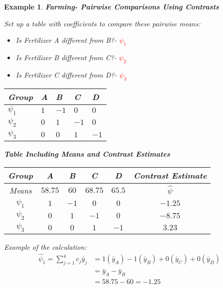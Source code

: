 \documentclass[a4paper,11pt]{article}
\newtheorem{eg}[thm]{Example}
\begin{document}
\begin{eg}
\normalfont
\textbf{Farming- Pairwise Comparisons Using Contrasts}

Set up a table with coefficients to compare these pairwise means:
\begin{itemize}
\item Is Fertilizer A different from B?- \textcolor{red}{$\psi_1$}
\item Is Fertilizer B different from C?- \textcolor{red}{$\psi_2$}
\item Is Fertilizer C different from D?- \textcolor{red}{$\psi_3$}
\end{itemize}

\begin{center}
\begin{tabular}{ |p{1cm}||p{1cm}|p{1cm}|p{1cm}|p{1cm}|  }
 \hline
 Group & A & B & C & D \\
 \hline
 $\psi_1$   & $1$    &$-1$&   $0$ & $0$\\
 $\psi_2$ &   $0$  & $1$   & $-1$ & $0$\\
 $\psi_3$ & $0$ & $0$ & $1$ & $-1$\\
 \hline
\end{tabular}
\end{center}
\newpage
\textbf{Table Including Means and Contrast Estimates}

\begin{center}
\begin{tabular}{ |c||c|c|c|c|c|  }
 \hline
 Group & A & B & C & D & Contrast Estimate\\
 \hline
 Means & $58.75$ & $60$ & $68.75$ & $65.5$ & $\hat{\psi}$\\
 \hline
 $\psi_1$   & $1$    &$-1$&   $0$ & $0$ & $-1.25$\\
 $\psi_2$ &   $0$  & $1$   & $-1$ & $0$ & $-8.75$\\
 $\psi_3$ & $0$ & $0$ & $1$ & $-1$ & $3.23$\\
 \hline
\end{tabular}
\end{center}

Example of the calculation: 
\begin{align*}
\hat{\psi}_1=\sum_{j=1}^4c_j\bar{y}_j&=1(\bar{y}_A)-1(\bar{y}_B)+0(\bar{y}_C)+0(\bar{y}_D)\\
&=\bar{y}_A-\bar{y}_B\\
&=58.75-60=-1.25
\end{align*}
\end{eg}
\end{document}
